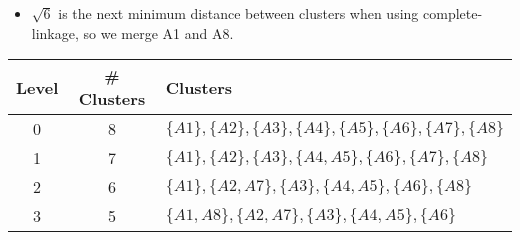 \documentclass[aspectratio=169, 10pt]{beamer}
\begin{document}
\begin{frame}[t]
    \begin{itemize}
        \item $\sqrt{6}$ is the next minimum distance between clusters when using complete-linkage, so we merge A1 and A8.
    \end{itemize}

    \begin{table}[]
        \scriptsize
        \begin{tabular}{c|c|l}
        Level & \# Clusters & Clusters \\ \hline
        0     & 8           & $\{A1\}, \{A2\}, \{A3\}, \{A4\}, \{A5\}, \{A6\}, \{A7\}, \{A8\}$\\
        1     & 7           & $\{A1\}, \{A2\}, \{A3\}, \{A4, A5\}, \{A6\}, \{A7\}, \{A8\}$\\
        2     & 6           & $\{A1\}, \{A2, A7\}, \{A3\}, \{A4, A5\}, \{A6\}, \{A8\}$\\
        3     & 5           & $\{A1, A8\}, \{A2, A7\}, \{A3\}, \{A4, A5\}, \{A6\}$\\
        \end{tabular}
    \end{table}


\end{frame}
\end{document}
